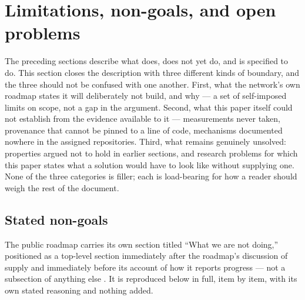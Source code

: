 \section{Limitations, non-goals, and open problems}
\label{sec:limitations}

The preceding sections describe what \Flux does, does not yet do, and is specified to do. This
section closes the description with three different kinds of boundary, and the three should not be
confused with one another. First, what the network's own roadmap states it will deliberately not
build, and why — a set of self-imposed limits on scope, not a gap in the argument. Second, what this
paper itself could not establish from the evidence available to it — measurements never taken,
provenance that cannot be pinned to a line of code, mechanisms documented nowhere in the assigned
repositories. Third, what remains genuinely unsolved: properties argued not to hold in earlier
sections, and research problems for which this paper states what a solution would have to look like
without supplying one. None of the three categories is filler; each is load-bearing for how a reader
should weigh the rest of the document.

\subsection{Stated non-goals}

The public roadmap carries its own section titled ``What we are not doing,'' positioned as a
top-level section immediately after the roadmap's discussion of supply and immediately before its
account of how it reports progress — not a subsection of anything else
. It is reproduced below in full, item by
item, with its own stated reasoning and nothing added.

